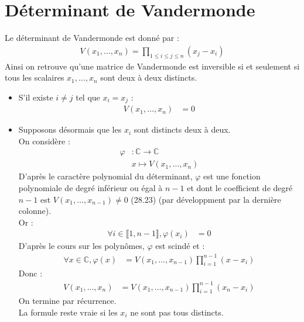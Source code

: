 \documentclass[../main.tex]{subfiles}
\begin{document}
\section{Déterminant de Vandermonde}
\begin{tcolorbox}[title=Propostion 30.71, title filled=false, colframe=lightblue, colback=lightblue!10!white]
    Le déterminant de Vandermonde est donné par :
    \begin{align*}
        V(x_1, \ldots, x_n) = \prod_{1\leq i\leq j\leq n} (x_j - x_i) 
    \end{align*}
    Ainsi on retrouve qu'une matrice de Vandermonde est inversible si et seulement si tous les scalaires $x_1, \ldots, x_n$ sont deux à deux distincts.
\end{tcolorbox}

\begin{itemize}
    \item S'il existe $i\neq j$ tel que $x_i = x_j$ : 
    \begin{align*}
        V(x_1, \ldots, x_n) &= 0
    \end{align*}
    \item Supposons désormais que les $x_i$ sont distincts deux à deux. \\
    On considère : 
    \begin{align*}
        \varphi&:\mathbb{C}\to \mathbb{C} \\
        &x\mapsto V(x_1, \ldots, x_n)
    \end{align*}
    D'après le caractère polynomial du déterminant, $\varphi$ est une fonction polynomiale de degré inférieur ou égal à $n-1$ et dont le coefficient de degré $n-1$ est $V(x_1, \ldots, x_{n-1}) \neq 0$ (28.23) (par développment par la dernière colonne). \\
    Or : 
    \begin{align*}
        \forall i\in \llbracket 1, n-1 \rrbracket, \varphi(x_i) &= 0
    \end{align*}
    D'après le cours sur les polynômes, $\varphi$ est scindé et : 
    \begin{align*}
        \forall x\in \mathbb{C}, \varphi(x) &= V(x_1, \ldots, x_{n-1}) \prod_{i=1}^{n-1} (x-x_i)
    \end{align*}
    Donc : 
    \begin{align*}
        V(x_1, \ldots, x_n) &= V(x_1, \ldots, x_{n-1}) \prod_{i=1}^{n-1} (x_n-x_i)
    \end{align*}
    On termine par récurrence. \\
    La formule reste vraie si les $x_i$ ne sont pas tous distincts. 
\end{itemize}
\end{document}
